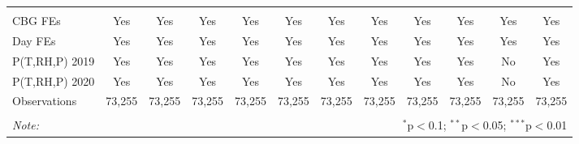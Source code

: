 \begin{table}[!htbp]
\begin{tabular}{@{\extracolsep{5pt}}lccccccccccc}
\hline \\[-1.8ex] 
CBG FEs & Yes & Yes & Yes & Yes & Yes & Yes & Yes & Yes & Yes & Yes & Yes \\ 
Day FEs & Yes & Yes & Yes & Yes & Yes & Yes & Yes & Yes & Yes & Yes & Yes \\ 
P(T,RH,P) 2019 & Yes & Yes & Yes & Yes & Yes & Yes & Yes & Yes & Yes & No & Yes \\ 
P(T,RH,P) 2020 & Yes & Yes & Yes & Yes & Yes & Yes & Yes & Yes & Yes & No & Yes \\ 
Observations & 73,255 & 73,255 & 73,255 & 73,255 & 73,255 & 73,255 & 73,255 & 73,255 & 73,255 & 73,255 & 73,255 \\ 
\hline 
\hline \\[-1.8ex] 
\textit{Note:}  & \multicolumn{11}{r}{$^{*}$p$<$0.1; $^{**}$p$<$0.05; $^{***}$p$<$0.01} \\ 
\end{tabular} 
\end{table} 
